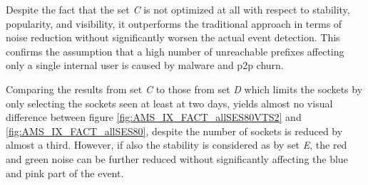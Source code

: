 Despite the fact that the set \emph{C} is not optimized at all with respect to stability, popularity, and visibility, it outperforms the traditional approach in terms of noise reduction without significantly worsen the actual event detection. 
This confirms the assumption that a high number of unreachable prefixes affecting only a single internal user is caused by malware and \gls{p2p} churn.

Comparing the results from set \emph{C} to those from set \emph{D} which limits the sockets by only selecting the sockets seen at least at two days, yields almost no visual difference between figure \ref{fig:AMS_IX_FACT_allSES80VTS2} and \ref{fig:AMS_IX_FACT_allSES80}, despite the number of sockets is reduced by almost a third. 
However, if also the stability is considered as by set \emph{E}, the red and green noise can be further reduced without significantly affecting the blue and pink part of the event.

